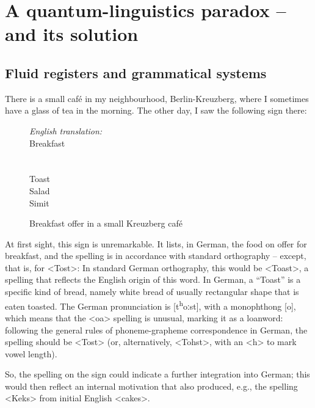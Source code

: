 \chapter{A quantum-linguistics paradox – and its solution}
\label{chap:1}


\section{Fluid registers and grammatical systems}
\label{sec:1.1}
There is a small café in my neighbourhood, Berlin-Kreuzberg, where I sometimes have a glass of tea in the morning. The other day, I saw the following sign there:

\begin{figure}[htbp]
 \begin{minipage}{0.4\textwidth}
        \centering
        \caption{Breakfast offer in a small Kreuzberg caf{é}}
        \label{fig:1}
    \end{minipage}
    \hfill
\begin{minipage}{0.5\textwidth}
        \textit{English translation:}
        \\
        Breakfast
        \\
        \\
        \\
        Toast\\
        Salad\\
        Simit
    \end{minipage}
\end{figure}

At first sight, this sign is unremarkable. It lists, in German, the food on offer for breakfast, and the spelling is in accordance with standard orthography – except, that is, for <Tost>: In standard German orthography, this would be <Toast>, a spelling that reflects the English origin of this word. In German, a “Toast” is a specific kind of bread, namely white bread of usually rectangular shape that is eaten toasted. The German pronunciation is [t\textsuperscript{h}oːst], with a monophthong [o], which means that the <oa> spelling is unusual, marking it as a loanword: following the general rules of phoneme-grapheme correspondence in German, the spelling should be <Tost> (or, alternatively, <Tohst>, with an <h> to mark vowel length).

So, the spelling on the sign could indicate a further integration into German; this would then reflect an internal motivation that also produced, e.g., the spelling <Keks> from initial English <cakes>.

